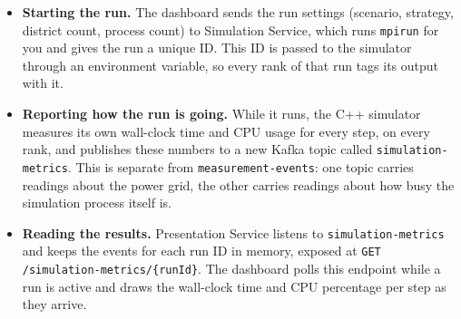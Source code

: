 \begin{itemize}
\item \textbf{Starting the run.} The dashboard sends the run settings (scenario, strategy,
  district count, process count) to Simulation Service, which runs \texttt{mpirun} for you and
  gives the run a unique ID. This ID is passed to the simulator through an environment variable, so
  every rank of that run tags its output with it.
\item \textbf{Reporting how the run is going.} While it runs, the C++ simulator measures its own
  wall-clock time and CPU usage for every step, on every rank, and publishes these numbers to a new
  Kafka topic called \texttt{simulation-metrics}. This is separate from
  \texttt{measurement-events}: one topic carries readings about the power grid, the other carries
  readings about how busy the simulation process itself is.
\item \textbf{Reading the results.} Presentation Service listens to \texttt{simulation-metrics}
  and keeps the events for each run ID in memory, exposed at
  \texttt{GET /simulation-metrics/\{runId\}}. The dashboard polls this endpoint while a run is
  active and draws the wall-clock time and CPU percentage per step as they arrive.
\end{itemize}
